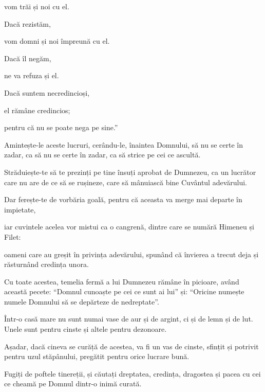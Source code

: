{\par }{\QB vom trăi și noi cu el.


\par }{\Q {}Dacă rezistăm,

\par }{\QB vom domni și noi împreună cu el.

\par }{\Q Dacă îl negăm,

\par }{\QB ne va refuza și el.


\par }{\Q {}Dacă suntem necredincioși,

\par }{\QB el rămâne credincios;

\par }{\QB pentru că nu se poate nega pe sine.”


\par }{\PP {}Amintește-le aceste lucruri, cerându-le, înaintea Domnului, să nu se certe în zadar, ca să nu se certe în zadar, ca să strice pe cei ce ascultă.


\par }{\PP {}Străduiește-te să te prezinți pe tine însuți aprobat de Dumnezeu, ca un lucrător care nu are de ce să se rușineze, care să mânuiască bine Cuvântul adevărului.

Dar ferește-te de vorbăria goală, pentru că aceasta va merge mai departe în impietate,

iar cuvintele acelea vor mistui ca o cangrenă, dintre care se numără Himeneu și Filet:

oameni care au greșit în privința adevărului, spunând că învierea a trecut deja și răsturnând credința unora.

Cu toate acestea, temelia fermă a lui Dumnezeu rămâne în picioare, având această pecete: “Domnul cunoaște pe cei ce sunt ai lui” și: “Oricine numește numele Domnului să se depărteze de nedreptate”.


\par }{\PP {}Într-o casă mare nu sunt numai vase de aur și de argint, ci și de lemn și de lut. Unele sunt pentru cinste și altele pentru dezonoare.

Așadar, dacă cineva se curăță de acestea, va fi un vas de cinste, sfințit și potrivit pentru uzul stăpânului, pregătit pentru orice lucrare bună.


\par }{\PP {}Fugiți de poftele tinereții, și căutați dreptatea, credința, dragostea și pacea cu cei ce cheamă pe Domnul dintr-o inimă curată.

}
